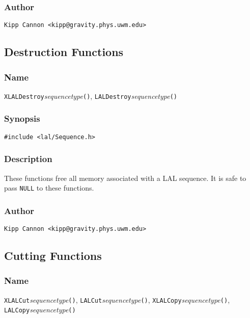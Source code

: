 \subsubsection{Author}

\verb|Kipp Cannon <kipp@gravity.phys.uwm.edu>|


\subsection{Destruction Functions}

\subsubsection{Name}

\texttt{XLALDestroy}\textit{sequencetype}\texttt{()},
\texttt{LALDestroy}\textit{sequencetype}\texttt{()}

\subsubsection{Synopsis}

\begin{verbatim}
#include <lal/Sequence.h>
\end{verbatim}


\subsubsection{Description}

These functions free all memory associated with a LAL sequence.  It is safe
to pass \texttt{NULL} to these functions.

\subsubsection{Author}

\verb|Kipp Cannon <kipp@gravity.phys.uwm.edu>|


\subsection{Cutting Functions}

\subsubsection{Name}

\texttt{XLALCut}\textit{sequencetype}\texttt{()},
\texttt{LALCut}\textit{sequencetype}\texttt{()},
\texttt{XLALCopy}\textit{sequencetype}\texttt{()},
\texttt{LALCopy}\textit{sequencetype}\texttt{()}

